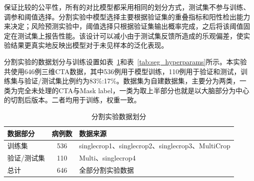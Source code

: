 保证比较的公平性，所有的对比模型都采用相同的划分方式，测试集不参与训练、调参和阈值选择。分割实验中模型选择主要根据验证集的重叠指标和阳性检出能力来决定；风险预测实验中，阈值选择只根据验证集输出概率完成，之后将该阈值固定在测试集上报告性能。该设计可以减小由于测试集反馈所造成的乐观偏差，使实验结果更真实地反映出模型对于未见样本的泛化表现。

分割实验的数据划分与训练设置如表~\ref{tab:seg_data_training_setup}和表~\ref{tab:seg_hyperparams}所示。本实验共使用646例三维CTA数据，其中536例用于模型训练，110例用于验证和测试，训练集与验证/测试集比例约为83\%:17\%。数据集为自建数据集，主要分为两类，一类为完全未处理的CTA与Mask label，一类为取上半部分也就是以大脑部分为中心的切割后版本。二者均用于训练，权重一致。

\begin{table}[!htbp]
\centering
\caption{分割实验数据划分}
\label{tab:seg_data_training_setup}
\small
\renewcommand{\arraystretch}{0.88}
\begin{tabular}{lcl}
\toprule
数据部分 & 病例数 & 数据来源 \\
\midrule
训练集 & 536 & singlecrop1、singlecrop2、singlecrop3、MultiCrop \\
验证/测试集 & 110 & Multi、singlecrop4 \\
总计 & 646 & 全部分割实验数据 \\
\bottomrule
\end{tabular}
\normalsize
\renewcommand{\arraystretch}{1}
\end{table}

